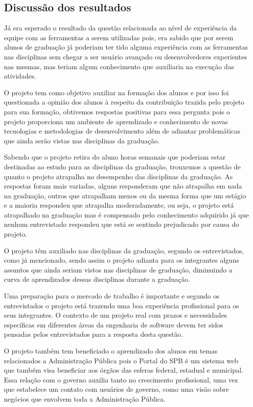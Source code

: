 \subsection{Discussão dos resultados}

Já era esperado o resultado da questão relacionada ao nível de experiência da equipe com as ferramentas a serem utilizadas pois, era sabido que por serem alunos de graduação já poderiam ter tido alguma experiência com as ferramentas nas disciplinas sem chegar a ser usuário avançado ou desenvolvedores experientes nas mesmas, mas teriam algum conhecimento que auxiliaria na execução das atividades.

O projeto tem como objetivo auxiliar na formação dos alunos e por isso foi questionada a opinião dos alunos à respeito da contribuição trazida pelo projeto para sua formação, obtivemos respostas positivas para essa pergunta pois o projeto proporciona um ambiente de aprendizado e conhecimento de novas tecnologias e metodologias de desenvolvimento além de adiantar problemáticas que ainda serão vistas nas disciplinas da graduação.

Sabendo que o projeto retira do aluno horas semanais que poderiam estar destinadas ao estudo para as disciplinas da graduação, trouxemos a questão de quanto o projeto atrapalha no desempenho das disciplinas da graduação. As respostas foram mais variadas, alguns responderam que não atrapalha em nada na graduação, outros que atrapalham menos ou da mesma forma que um estágio e a maioria respondeu que atrapalha moderadamente, ou seja, o projeto está atrapalhado na graduação mas é compensado pelo conhecimento adquirido já que nenhum entrevistado respondeu que está se sentindo prejudicado por causa do projeto.

O projeto têm auxiliado nas disciplinas da graduação, segundo os entrevistados, como já mencionado, sendo assim o projeto adianta para os integrantes alguns assuntos que ainda seriam vistos nas disciplinas de graduação, diminuindo a curva de aprendizados dessas disciplinas durante a graduação.

Uma preparação para o mercado de trabalho é importante e segundo os entrevistados o projeto está trazendo uma boa experiência profissional para os seus integrantes. O contexto de um projeto real com prazos e necessidades específicas em diferentes áreas da engenharia de software devem ter sidos pensadas pelos entrevistados para a resposta desta questão. 

O projeto também tem beneficiado o aprendizado dos alunos em temas relacionados a Administração Pública pois o Portal do SPB é um sistema web que também visa beneficiar aos órgãos das esferas federal, estadual e municipal. Essa relação com o governo auxilia tanto no crescimento profissional, uma vez que estabelece um contato com usuários de governo, como uma visão sobre negócios que envolvem toda a Administração Pública.